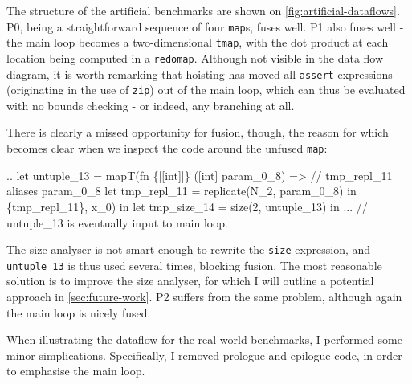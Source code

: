 The structure of the artificial benchmarks are shown on
\cref{fig:artificial-dataflows}.  P0, being a straightforward sequence
of four \texttt{map}s, fuses well.  P1 also fuses well - the main loop
becomes a two-dimensional \texttt{tmap}, with the dot product at each
location being computed in a \texttt{redomap}.  Although not visible
in the data flow diagram, it is worth remarking that hoisting has
moved all \texttt{assert} expressions (originating in the use of
\texttt{zip}) out of the main loop, which can thus be evaluated with
no bounds checking - or indeed, any branching at all.

There is clearly a missed opportunity for fusion, though, the reason
for which becomes clear when we inspect the code around the unfused
\texttt{map}:
\begin{colorcode}
..
let {untuple_13} =
  mapT(fn \{[[int]]\} ([int] param_0_8) =>
         // tmp_repl_11 aliases param_0_8
         let tmp_repl_11 = replicate(N_2, param_0_8) in
         \{tmp_repl_11\},
       x_0) in
let tmp_size_14 = size(2, untuple_13) in
... // untuple_13 is eventually input to main loop.
\end{colorcode}
The size analyser is not smart enough to rewrite the \texttt{size}
expression, and \texttt{untuple\_13} is thus used several times,
blocking fusion.  The most reasonable solution is to improve the size
analyser, for which I will outline a potential approach in
\cref{sec:future-work}.  P2 suffers from the same problem, although
again the main loop is nicely fused.

When illustrating the dataflow for the real-world benchmarks, I
performed some minor simplications.  Specifically, I removed prologue
and epilogue code, in order to emphasise the main loop.

